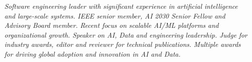 {\selectfont
	\begin{justify}\textit{Software engineering leader with significant experience in artificial intelligence and large-scale systems. IEEE senior member, AI 2030 Senior Fellow and Advisory Board member. Recent focus on scalable AI/ML platforms and organizational growth. Speaker on AI, Data and engineering leadership. Judge for industry awards, editor and reviewer for technical publications. Multiple awards for driving global adoption and innovation in AI and Data.}\end{justify}
}
\vspace{-12pt}